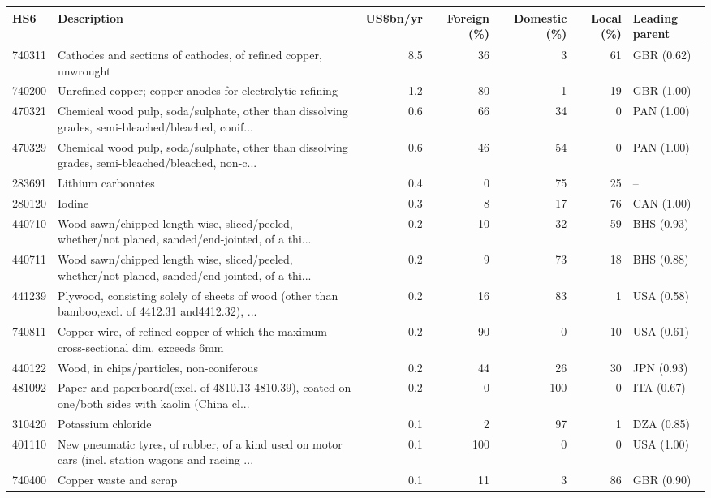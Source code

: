\begin{tabular}{@{}l p{6.4cm} r r r r l@{}}
\toprule
HS6 & Description & US\$bn/yr & Foreign (\%) & Domestic (\%) & Local (\%) & Leading parent \\
\midrule
740311 & Cathodes and sections of cathodes, of refined copper, unwrought & 8.5 & 36 & 3 & 61 & GBR (0.62) \\
740200 & Unrefined copper; copper anodes for electrolytic refining & 1.2 & 80 & 1 & 19 & GBR (1.00) \\
470321 & Chemical wood pulp, soda/\allowbreak{}sulphate, other than dissolving grades, semi-bleached/\allowbreak{}bleached, conif... & 0.6 & 66 & 34 & 0 & PAN (1.00) \\
470329 & Chemical wood pulp, soda/\allowbreak{}sulphate, other than dissolving grades, semi-bleached/\allowbreak{}bleached, non-c... & 0.6 & 46 & 54 & 0 & PAN (1.00) \\
283691 & Lithium carbonates & 0.4 & 0 & 75 & 25 & -- \\
280120 & Iodine & 0.3 & 8 & 17 & 76 & CAN (1.00) \\
440710 & Wood sawn/\allowbreak{}chipped length wise, sliced/\allowbreak{}peeled, whether/\allowbreak{}not planed, sanded/\allowbreak{}end-jointed, of a thi... & 0.2 & 10 & 32 & 59 & BHS (0.93) \\
440711 & Wood sawn/\allowbreak{}chipped length wise, sliced/\allowbreak{}peeled, whether/\allowbreak{}not planed, sanded/\allowbreak{}end-jointed, of a thi... & 0.2 & 9 & 73 & 18 & BHS (0.88) \\
441239 & Plywood, consisting solely of sheets of wood (other than bamboo,excl. of 4412.31 and4412.32), ... & 0.2 & 16 & 83 & 1 & USA (0.58) \\
740811 & Copper wire, of refined copper of which the maximum cross-sectional dim. exceeds 6mm & 0.2 & 90 & 0 & 10 & USA (0.61) \\
440122 & Wood, in chips/\allowbreak{}particles, non-coniferous & 0.2 & 44 & 26 & 30 & JPN (0.93) \\
481092 & Paper and paperboard(excl. of 4810.13-4810.39), coated on one/\allowbreak{}both sides with kaolin (China cl... & 0.2 & 0 & 100 & 0 & ITA (0.67) \\
310420 & Potassium chloride & 0.1 & 2 & 97 & 1 & DZA (0.85) \\
401110 & New pneumatic tyres, of rubber, of a kind used on motor cars (incl. station wagons and racing ... & 0.1 & 100 & 0 & 0 & USA (1.00) \\
740400 & Copper waste and scrap & 0.1 & 11 & 3 & 86 & GBR (0.90) \\
\bottomrule
\end{tabular}

